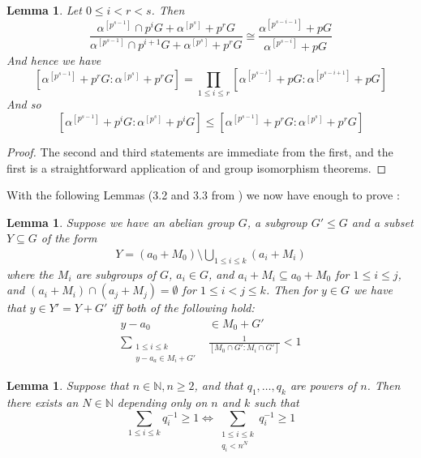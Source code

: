 \documentclass[a4paper,11pt]{article}
\newtheorem{lemma}[theorem]{Lemma}
\renewcommand{\iff}{\Longleftrightarrow}
\begin{document}
\begin{lemma}\label{Describing a^p^j - a^p^s quotients}
	Let $0\leq i < r<s$. Then
	$$\frac{\alpha^{[p^{s-1}]}\cap p^iG + \alpha^{[p^s]}+p^rG}{\alpha^{[p^{s-1}]}\cap p^{i+1}G + \alpha^{[p^s]}+p^rG} \cong \frac{\alpha^{[p^{s-i-1}]}+pG}{\alpha^{[p^{s-i}]}+pG}$$
	And hence we have
	$$[\alpha^{[p^{s-1}]}+p^rG:\alpha^{[p^s]}+p^rG] = \prod\limits_{1\leq i 
		\leq r} [{\alpha^{[p^{s-i}]}+pG}:{\alpha^{[p^{s-i+1}]}+pG}]$$
	And so $$[\alpha^{[p^{s-1}]}+p^iG:\alpha^{[p^s]}+p^iG]\leq [\alpha^{[p^{s-1}]}+p^rG:\alpha^{[p^s]}+p^rG]$$
\end{lemma}
\begin{proof}
	The second and third statements are immediate from the first, and the first is a straightforward application of  and group isomorphism theorems.
\end{proof}
\noindent With the following Lemmas (3.2 and 3.3 from \cite{QE}) we now have enough to prove :
\begin{lemma}\label{QE 3.2}
    Suppose we have an abelian group $G$, a subgroup $G'\leq G$ and a subset $Y\subseteq G$ of the form
    \begin{align*}
            Y = (a_0+M_0)\setminus \bigcup\limits_{1\leq i\leq k}(a_i+M_i)
    \end{align*}
    where the $M_i$ are subgroups of $G$, $a_i\in G$, and $a_i+M_i\subseteq a_0+M_0$ for $1\leq i \leq j$, and $(a_i+M_i)\cap (a_j+M_j)=\emptyset$ for $1\leq i < j\leq k$. Then for $y\in G$ we have that $y\in Y'=Y+G'$ iff both of the following hold:
    \begin{align}
    	y-a_0 & \in M_0 + G' \\
    	\sum\limits_{\substack{1\leq i\leq k \\ y-a_a\in M_i+G'}} & \frac{1}{[M_0\cap G':M_i\cap G'] } < 1
    \end{align}
\end{lemma}
\begin{lemma}\label{QE 3.3}
    Suppose that $n\in\mathbb{N}, n\geq 2$, and that $q_1,\dots,q_k$ are powers of $n$. Then there exists an $N\in\mathbb{N}$ depending only on $n$ and $k$ such that $$\sum\limits_{1\leq i\leq k} q_i^{-1} \geq 1 \iff \sum\limits_{\substack{1\leq i\leq k \\ q_i < n^N}} q_i^{-1} \geq 1$$
\end{lemma}
\end{document}
